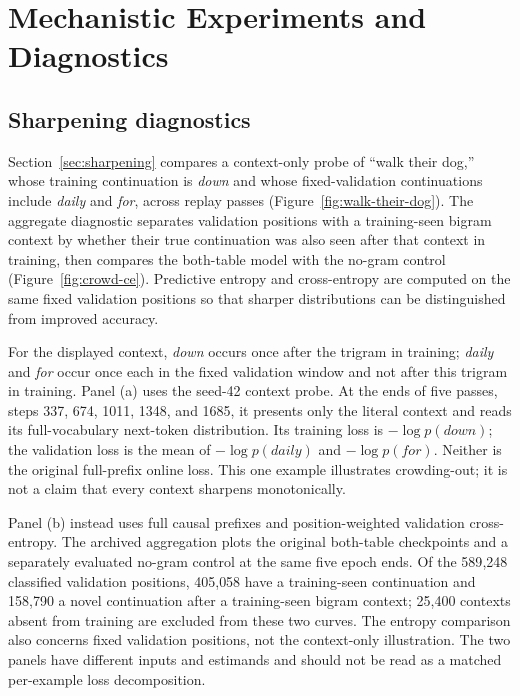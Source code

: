 \section{Mechanistic Experiments and Diagnostics}
\label{app:mechanistic}

\subsection{Sharpening diagnostics}

Section~\ref{sec:sharpening} compares a context-only probe of ``walk their dog,'' whose training continuation is \emph{down} and whose fixed-validation continuations include \emph{daily} and \emph{for}, across replay passes (Figure~\ref{fig:walk-their-dog}). The aggregate diagnostic separates validation positions with a training-seen bigram context by whether their true continuation was also seen after that context in training, then compares the both-table model with the no-gram control (Figure~\ref{fig:crowd-ce}). Predictive entropy and cross-entropy are computed on the same fixed validation positions so that sharper distributions can be distinguished from improved accuracy.

For the displayed context, \emph{down} occurs once after the trigram in training; \emph{daily} and \emph{for} occur once each in the fixed validation window and not after this trigram in training. Panel (a) uses the seed-42  context probe. At the ends of five passes, steps 337, 674, 1011, 1348, and 1685, it presents only the literal context and reads its full-vocabulary next-token distribution. Its training loss is $-\log p(\textit{down})$; the validation loss is the mean of $-\log p(\textit{daily})$ and $-\log p(\textit{for})$. Neither is the original full-prefix online loss. This one example illustrates crowding-out; it is not a claim that every context sharpens monotonically.

Panel (b) instead uses full causal prefixes and position-weighted validation cross-entropy. The archived aggregation  plots the original both-table checkpoints and a separately evaluated no-gram control at the same five epoch ends. Of the 589{,}248 classified validation positions, 405{,}058 have a training-seen continuation and 158{,}790 a novel continuation after a training-seen bigram context; 25{,}400 contexts absent from training are excluded from these two curves. The entropy comparison also concerns fixed validation positions, not the context-only illustration. The two panels have different inputs and estimands and should not be read as a matched per-example loss decomposition.

